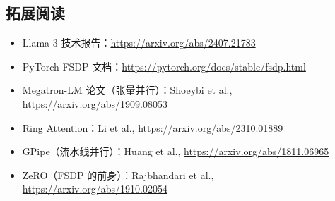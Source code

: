 \documentclass[a4paper]{article}
\begin{document}
\subsection{拓展阅读}

\begin{itemize}
    \item Llama 3 技术报告：\url{https://arxiv.org/abs/2407.21783}
    \item PyTorch FSDP 文档：\url{https://pytorch.org/docs/stable/fsdp.html}
    \item Megatron-LM 论文（张量并行）：Shoeybi et al., \url{https://arxiv.org/abs/1909.08053}
    \item Ring Attention：Li et al., \url{https://arxiv.org/abs/2310.01889}
    \item GPipe（流水线并行）：Huang et al., \url{https://arxiv.org/abs/1811.06965}
    \item ZeRO（FSDP 的前身）：Rajbhandari et al., \url{https://arxiv.org/abs/1910.02054}
\end{itemize}
\end{document}
